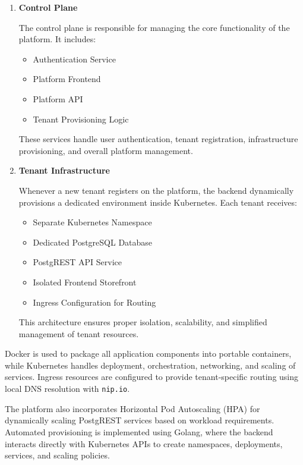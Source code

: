\documentclass[12pt,a4paper]{report}
\begin{document}
\begin{enumerate}

    \item \textbf{Control Plane}
    
    The control plane is responsible for managing the core functionality of the platform. It includes:
    
    \begin{itemize}
        \item Authentication Service
        \item Platform Frontend
        \item Platform API
        \item Tenant Provisioning Logic
    \end{itemize}
    
    These services handle user authentication, tenant registration, infrastructure provisioning, and overall platform management.

    \item \textbf{Tenant Infrastructure}
    
    Whenever a new tenant registers on the platform, the backend dynamically provisions a dedicated environment inside Kubernetes. Each tenant receives:
    
    \begin{itemize}
        \item Separate Kubernetes Namespace
        \item Dedicated PostgreSQL Database
        \item PostgREST API Service
        \item Isolated Frontend Storefront
        \item Ingress Configuration for Routing
    \end{itemize}
    
    This architecture ensures proper isolation, scalability, and simplified management of tenant resources.

\end{enumerate}

Docker is used to package all application components into portable containers, while Kubernetes handles deployment, orchestration, networking, and scaling of services. Ingress resources are configured to provide tenant-specific routing using local DNS resolution with \texttt{nip.io}.

The platform also incorporates Horizontal Pod Autoscaling (HPA) for dynamically scaling PostgREST services based on workload requirements. Automated provisioning is implemented using Golang, where the backend interacts directly with Kubernetes APIs to create namespaces, deployments, services, and scaling policies.
\end{document}
